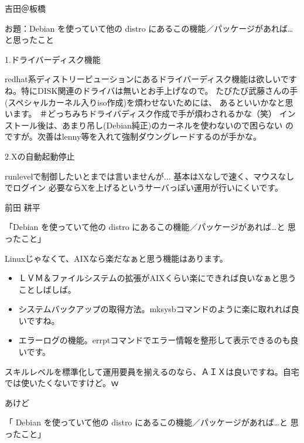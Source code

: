 \documentclass[cjk,dvipdfmx,12pt]{beamer}
\begin{document}

\begin{frame}{吉田＠板橋}

お題：Debian を使っていて他の distro にあるこの機能／パッケージがあれば…
と思ったこと

1.ドライバーディスク機能

redhat系ディストリービューションにあるドライバーディスク機能は欲しいです
ね。特にDISK関連のドライバは無いとお手上げなので。
たびたび武藤さんの手(スペシャルカーネル入りiso作成)を煩わせないためには、
あるといいかなと思います。
＃どっちみちドライバディスク作成で手が煩わされるかな（笑）
インストール後は、あまり吊し(Debian純正)のカーネルを使わないので困らない
のですが。次善はlenny等を入れて強制ダウングレードするのが手かな。

2.Xの自動起動停止

runlevelで制御したいとまでは言いませんが...
基本はXなしで速く、マウスなしでログイン
必要ならXを上げるというサーバっぽい運用が行いにくいです。


\end{frame}\begin{frame}{前田 耕平}

「Debian を使っていて他の distro にあるこの機能／パッケージがあれば…と
思ったこと」

Linuxじゃなくて、AIXなら楽だなぁと思う機能はあります。

\begin{itemize}
 \item ＬＶＭ＆ファイルシステムの拡張がAIXくらい楽にできれば良いなぁと思うことしばしば。
 \item システムバックアップの取得方法。mksysbコマンドのように楽に取れれば良いですね。
 \item エラーログの機能。errptコマンドでエラー情報を整形して表示できるのも良いです。
\end{itemize}

スキルレベルを標準化して運用要員を揃えるのなら、ＡＩＸは良いですね。自宅
では使いたくないですけど。ｗ


\end{frame}\begin{frame}{あけど}

「 Debian を使っていて他の distro にあるこの機能／パッケージがあれば…と
思ったこと」


\end{frame}
\end{document}
